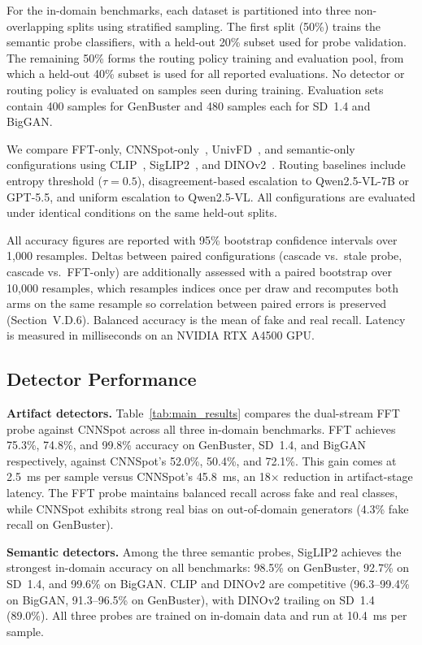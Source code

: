 \documentclass{ieeeaccess}
\begin{document}
For the in-domain benchmarks, each dataset is partitioned into three non-overlapping splits
using stratified sampling. The first split (50\%) trains the semantic probe classifiers,
with a held-out 20\% subset used for probe validation. The remaining 50\% forms the routing
policy training and evaluation pool, from which a held-out 40\% subset is used for all
reported evaluations. No detector or routing policy is evaluated on samples seen during
training. Evaluation sets contain 400 samples for GenBuster and 480 samples each for
SD~1.4 and BigGAN.

We compare FFT-only, CNNSpot-only~\cite{wang2020cnn}, UnivFD~\cite{ojha2023fakedetect},
and semantic-only configurations using CLIP~\cite{pmlr-v139-radford21a},
SigLIP2~\cite{tschannen2025siglip2}, and DINOv2~\cite{oquab2023dinov2}. Routing
baselines include entropy threshold ($\tau = 0.5$), disagreement-based escalation to Qwen2.5-VL-7B or GPT-5.5, and uniform escalation to Qwen2.5-VL. All configurations
are evaluated under identical conditions on the same held-out splits.

All accuracy figures are reported with 95\% bootstrap confidence intervals over 1{,}000
resamples. Deltas between paired configurations (cascade vs.\ stale probe, cascade vs.\
FFT-only) are additionally assessed with a paired bootstrap over 10{,}000 resamples,
which resamples indices once per draw and recomputes both arms on the same resample so
correlation between paired errors is preserved (Section~V.D.6). Balanced accuracy is the mean of fake and real recall. Latency is measured in
milliseconds on an NVIDIA RTX A4500 GPU.

\subsection{Detector Performance}


\textbf{Artifact detectors.} Table~\ref{tab:main_results} compares the dual-stream
FFT probe against CNNSpot across all three in-domain benchmarks. FFT achieves 75.3\%,
74.8\%, and 99.8\% accuracy on GenBuster, SD~1.4, and BigGAN respectively, against
CNNSpot's 52.0\%, 50.4\%, and 72.1\%. This gain comes at 2.5~ms per sample versus
CNNSpot's 45.8~ms, an 18$\times$ reduction in artifact-stage latency. The FFT probe
maintains balanced recall across fake and real classes, while CNNSpot exhibits strong real
bias on out-of-domain generators (4.3\% fake recall on GenBuster).

\textbf{Semantic detectors.} Among the three semantic probes, SigLIP2 achieves the
strongest in-domain accuracy on all benchmarks: 98.5\% on GenBuster, 92.7\% on SD~1.4,
and 99.6\% on BigGAN. CLIP and DINOv2 are competitive (96.3--99.4\% on BigGAN, 91.3--96.5\% on GenBuster), with DINOv2 trailing on SD~1.4 (89.0\%). 
All three probes are trained on in-domain data and run at 10.4~ms per sample.
\end{document}
